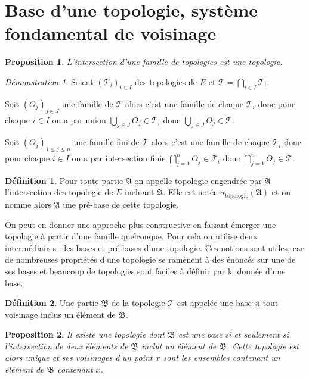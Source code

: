 \documentclass[a4paper, 11pt, french]{book}
\newenvironment{itemise}{\itemize}{\enditemize}
\theoremstyle{plain} %
\newtheorem{proposition}{Proposition}
\theoremstyle{definition} %
\newtheorem{definition}{Définition}
\theoremstyle{remark} %
\newtheorem*{demonstration}{Démonstration}
\newcommand{\1}{\mathds{1}}
\renewcommand{\frak}[1]{\mathfrak{#1}}
\newcommand{\scr}[1]{\mathscr{#1}}
\renewcommand{\rm}[1]{\mathrm{#1}}
\begin{document}
\section{Base d'une topologie, système fondamental de voisinage}

\begin{proposition}
	L'intersection d'une famille de topologies est une topologie.
\end{proposition}

\begin{demonstration}
	Soient $(\scr{T}_i)_{i\in I}$ des topologies de $E$ et $\scr{T}=\bigcap_{i\in I}\scr{T}_i$.
	\begin{itemise}
		\item Soit $(O_j)_{j\in J}$ une famille de $\scr{T}$ alors c'est une famille de chaque $\scr{T}_i$ donc pour chaque $i\in I$ on a par union $\bigcup_{j\in J}O_j\in\scr{T}_i$ donc $\bigcup_{j\in J}O_j\in\scr{T}$.
		\item Soit $(O_j)_{1\leqslant j\leqslant n}$ une famille fini de $\scr{T}$ alors c'est une famille de chaque $\scr{T}_i$ donc pour chaque $i\in I$ on a par intersection finie $\bigcap_{j=1}^nO_j\in\scr{T}_i$ donc $\bigcap_{j=1}^nO_j\in\scr{T}$.
	\end{itemise}
\end{demonstration}

\begin{definition}
	Pour toute partie $\frak{A}$ on appelle topologie engendrée par $\frak{A}$ l'intersection des topologie de $E$ incluant $\frak{A}$.
	Elle est notée $\sigma_\rm{topologie}(\frak{A})$ et on nomme alors $\frak{A}$ une pré-base de cette topologie.
\end{definition}

On peut en donner une approche plus constructive en faisant émerger une topologie à partir d'une famille quelconque.
Pour cela on utilise deux intermédiaires : les bases et pré-bases d'une topologie.
Ces notions sont utiles, car de nombreuses propriétés d'une topologie se ramènent à des énoncés sur une de ses bases et beaucoup de topologies sont faciles à définir par la donnée d'une base. 

\begin{definition}
	Une partie $\frak{B}$ de la topologie $\scr{T}$ est appelée une base si tout voisinage inclus un élément de $\frak{B}$.
\end{definition}

\begin{proposition}
	Il existe une topologie dont $\frak{B}$ est une base si et seulement si l'intersection de deux éléments de $\frak{B}$ inclut un élément de $\frak{B}$.
	Cette topologie est alors unique et ses voisinages d'un point $x$ sont les ensembles contenant un élément de $\frak{B}$ contenant $x$.
\end{proposition}
\end{document}
